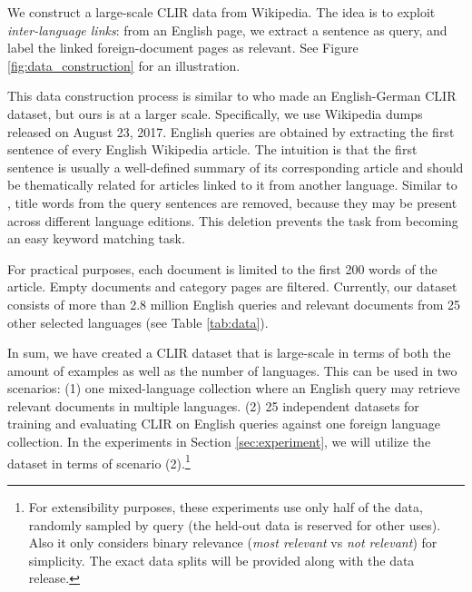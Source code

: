 \documentclass[11pt,a4paper]{article}
\begin{document}
We construct a large-scale CLIR data from Wikipedia.
The idea is to exploit \textit{inter-language links}: from an English page, we extract a sentence as query, and label the linked foreign-document pages as relevant. 
See Figure \ref{fig:data_construction} for an illustration. 

This data construction process is similar to \cite{schamoni14} who made an English-German CLIR dataset, but ours is at a larger scale. 
Specifically, we use Wikipedia dumps released on August 23, 2017. 
English queries are obtained by extracting the first sentence of every English Wikipedia article. 
The intuition is that the first sentence is usually a well-defined summary of its corresponding article and should be thematically related for articles linked to it from another language. 
Similar to \cite{schamoni14}, title words from the query sentences are removed, because they may be present across different language editions. 
This deletion prevents the task from becoming an easy keyword matching task. 

For practical purposes, each document is limited to the first 200 words of the article. Empty documents and category pages are filtered.
Currently, our dataset consists of more than 2.8 million English queries and relevant documents from 25 other selected languages (see Table \ref{tab:data}).

In sum, we have created a CLIR dataset that is large-scale in terms of both the amount of examples as well as the number of languages.
This can be used in two scenarios: (1) one mixed-language collection where an English query may retrieve relevant documents in multiple languages. (2) 25 independent datasets for training and evaluating CLIR on English queries against one foreign language collection. In the experiments in Section \ref{sec:experiment}, we will utilize the dataset in terms of scenario (2).\footnote{For extensibility purposes, these experiments use only half of the data, randomly sampled by query (the held-out data is reserved for other uses). Also it only considers binary relevance (\textit{most relevant} vs \textit{not relevant}) for simplicity. The exact data splits will be provided along with the data release.} 



\end{document}

